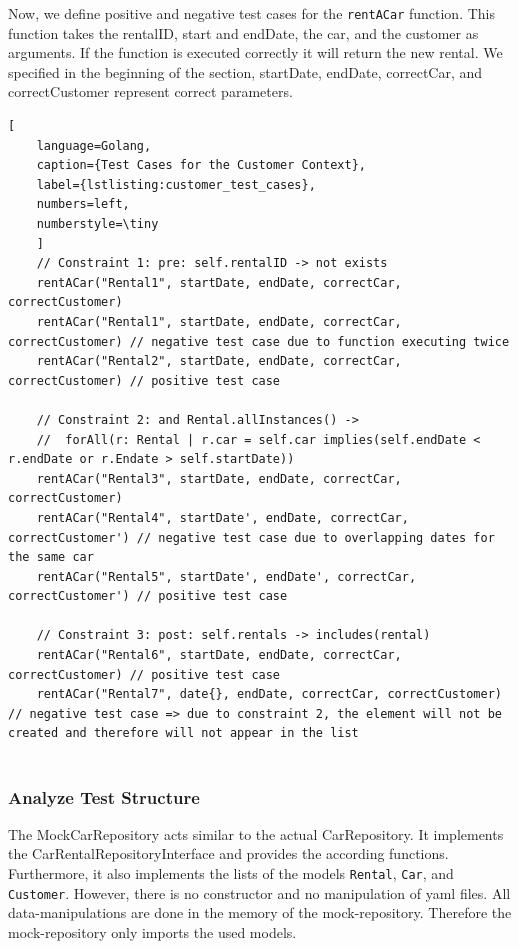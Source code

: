 Now, we define positive and negative test cases for the \texttt{rentACar\(\)} function.
This function takes the rentalID, start and endDate, the car, and the customer as arguments.
If the function is executed correctly it will return the new rental.
We specified in the beginning of the section, startDate, endDate, correctCar, and correctCustomer represent correct parameters.

\begin{lstlisting}[
    language=Golang,
    caption={Test Cases for the Customer Context},
    label={lstlisting:customer_test_cases},
    numbers=left,
    numberstyle=\tiny
    ]
    // Constraint 1: pre: self.rentalID -> not exists
    rentACar("Rental1", startDate, endDate, correctCar, correctCustomer)
    rentACar("Rental1", startDate, endDate, correctCar, correctCustomer) // negative test case due to function executing twice
    rentACar("Rental2", startDate, endDate, correctCar, correctCustomer) // positive test case

    // Constraint 2: and Rental.allInstances() -> 
    //  forAll(r: Rental | r.car = self.car implies(self.endDate < r.endDate or r.Endate > self.startDate))
    rentACar("Rental3", startDate, endDate, correctCar, correctCustomer)
    rentACar("Rental4", startDate', endDate, correctCar, correctCustomer') // negative test case due to overlapping dates for the same car
    rentACar("Rental5", startDate', endDate', correctCar, correctCustomer') // positive test case 

    // Constraint 3: post: self.rentals -> includes(rental)
    rentACar("Rental6", startDate, endDate, correctCar, correctCustomer) // positive test case
    rentACar("Rental7", date{}, endDate, correctCar, correctCustomer) // negative test case => due to constraint 2, the element will not be created and therefore will not appear in the list
    
\end{lstlisting}

\subsubsection*{Analyze Test Structure}
The MockCarRepository acts similar to the actual CarRepository.
It implements the CarRentalRepositoryInterface and provides the according functions.
Furthermore, it also implements the lists of the models \texttt{Rental}, \texttt{Car}, and \texttt{Customer}.
However, there is no constructor and no manipulation of yaml files.
All data-manipulations are done in the memory of the mock-repository.
Therefore the mock-repository only imports the used models.

